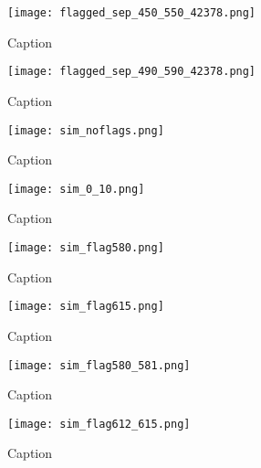 \documentclass[12pt]{article}
\begin{document}
\begin{figure}[p]
	\centering
	\texttt{[image: flagged\_sep\_450\_550\_42378.png]}
	\caption[Power spectrum after flagging non-contiguous center channels]{Caption}
	\label{fig:flagged_sep_450_550}
\end{figure}

\begin{figure}[p]
	\centering
	\texttt{[image: flagged\_sep\_490\_590\_42378.png]}
	\caption[Power spectrum after flagging non-contiguous edge channels]{Caption}
	\label{fig:flagged_sep_490_590}
\end{figure}

\begin{figure}[p]
	\centering
	\texttt{[image: sim\_noflags.png]}
	\caption[Simulated power spectrum without flagging]{Caption}
	\label{fig:sim_noflags}
\end{figure}

\begin{figure}[p]
	\centering
	\texttt{[image: sim\_0\_10.png]}
	\caption[Simulated power spectrum with no flagged channels and flagged time integrations]{Caption}
	\label{fig:sim_0_10}
\end{figure}

\begin{figure}[p]
	\centering
	\texttt{[image: sim\_flag580.png]}
	\caption[Simulated power spectrum after flagging one central channel]{Caption}
	\label{fig:flagged_chan_580}
\end{figure}

\begin{figure}[p]
	\centering
	\texttt{[image: sim\_flag615.png]}
	\caption[Simulated power spectrum after flagging one edge channel]{Caption}
	\label{fig:flagged_chan_615}
\end{figure}

\begin{figure}[p]
	\centering
	\texttt{[image: sim\_flag580\_581.png]}
	\caption[Simulated power spectrum after flagging two contiguous center channels]{Caption}
	\label{fig:flagged_chan_580_581}
\end{figure}

\begin{figure}[p]
	\centering
	\texttt{[image: sim\_flag612\_615.png]}
	\caption[Simulated power spectrum after flagging four contiguous edge channels]{Caption}
	\label{fig:flagged_chan_612_615}
\end{figure}
\end{document}
